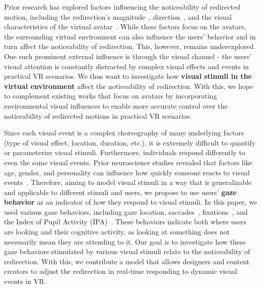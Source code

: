 Prior research has explored factors influencing the noticeability of redirected motion, including the redirection's magnitude~\cite{wentzel2020improving, poupyrev1996go}, direction~\cite{li2022modeling, feuchtner2018ownershift}, and the visual characteristics of the virtual avatar~\cite{ogawa2020effect, feick2024impact}.
While these factors focus on the avatars, the surrounding virtual environment can also influence the users' behavior and in turn affect the noticeability of redirection.
This, however, remains underexplored.
One such prominent external influence is through the visual channel - the users' visual attention is constantly distracted by complex visual effects and events in practical VR scenarios.
We thus want to investigate how \textbf{visual stimuli in the virtual environment} affect the noticeability of redirection.
With this, we hope to complement existing works that focus on avatars by incorporating environmental visual influences to enable more accurate control over the noticeability of redirected motions in practical VR scenarios.

Since each visual event is a complex choreography of many underlying factors (type of visual effect, location, duration, etc.), it is extremely difficult to quantify or parameterize visual stimuli.
Furthermore, individuals respond differently to even the same visual events.
Prior neuroscience studies revealed that factors like age, gender, and personality can influence how quickly someone reacts to visual events~\cite{gillon2024responses, gale1997human}. 
Therefore, aiming to model visual stimuli in a way that is generalizable and applicable to different stimuli and users, we propose to use users' \textbf{gaze behavior} as an indicator of how they respond to visual stimuli.
In this paper, we used various gaze behaviors, including gaze location, saccades~\cite{krejtz2018eye}, fixations~\cite{perkhofer2019using}, and the Index of Pupil Activity (IPA)~\cite{duchowski2018index}.
These behaviors indicate both where users are looking and their cognitive activity, as looking at something does not necessarily mean they are attending to it.
Our goal is to investigate how these gaze behaviors stimulated by various visual stimuli relate to the noticeability of redirection.
With this, we contribute a model that allows designers and content creators to adjust the redirection in real-time responding to dynamic visual events in VR.

